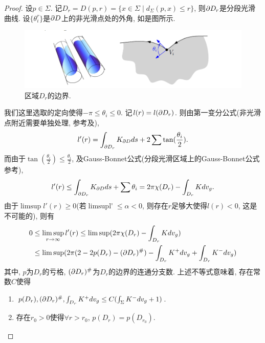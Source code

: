 \begin{proof}
    设$p \in \Sigma$. 记$D_r=D(p,r)=\{x\in \Sigma \mid d_\Sigma(p,x) \le r\}$, 则$\P D_r$是分段光滑曲线. 设$\{\theta^r_i\}$是$\P D$上的非光滑点处的外角, 如是图所示.
    \begin{figure}[ht]
        \centering
        \includegraphics[scale=0.8]{images/angle.png}
        \caption{区域$D_r$的边界.}
        \label{angle}
    \end{figure}
    我们这里选取的定向使得$-\pi \le \theta_i \le 0$.  记$l(r)=l(\P D_r)$. 则由第一变分公式(非光滑点附近需要单独处理, 参考\cite{White}及\cite{Perez}),
    \begin{equation}
        l'(r)=\int_{\P D_r}K_{\P D}ds+2\sum \tan(\frac{\theta_i}{2}).
    \end{equation}
    而由于$\tan(\frac{\theta_i}{2}) \le \frac{\theta_i}{2}$, 及Gauss-Bonnet公式(分段光滑区域上的Gauss-Bonnet公式参考\cite{lee}),
    \begin{equation}
        l'(r)\le \int_{\P D_r}K_{\P D}ds+\sum \theta_i = 2\pi\chi(D_r)-\int_{D_r}Kdv_g.
    \end{equation}
    由于$\mathop{\limsup} l'(r) \ge 0$(若$ \mathop{\limsup l'(r)} \le \alpha <0$, 则存在$r$足够大使得$l(r) < 0$, 这是不可能的), 则有
    \begin{equation} \label{basic_inequality}
        \begin{split}
            0 &\le \limsup_{r\to \infty} l'(r) \le \limsup(2\pi \chi(D_r) - \int_{D_r}Kdv_g) \\
            & \le \limsup (2\pi(2-2p(D_r)-(\P D_r)^\#)-\int_{D_r}K^+dv_g+\int_{D_r}K^-dv_g)
        \end{split}
    \end{equation}
    其中, $p$为$D_r$的亏格, $(\P D_r)^\#$为$D_r$的边界的连通分支数. 上述不等式意味着, 存在常数$C$使得
    \begin{enumerate}
        \item $p(D_r), (\P D_r)^\#, \int_{D_r}K^+dv_g \le C(\int_\Sigma K^-dv_g +1)$. \label{finite}
        \item 存在$r_0>0$使得$\forall r > r_0$, $p(D_r) = p(D_{r_0})$. \label{genus}
    \end{enumerate}

\end{proof}
